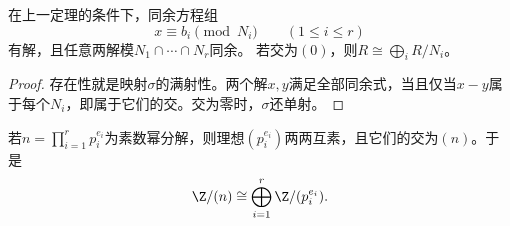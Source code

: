 \begin{corollary}\label{p2:ring-crt-congruence}
在上一定理的条件下，同余方程组
\[
x\equiv b_i\pmod{N_i}\qquad(1\leq i\leq r)
\]
有解，且任意两解模$N_1\cap\cdots\cap N_r$同余。
若交为$(0)$，则$R\cong\bigoplus_i R/N_i$。
\end{corollary}
\begin{proof}
存在性就是映射$\sigma$的满射性。两个解$x,y$满足全部同余式，当且仅当$x-y$属于每个$N_i$，即属于它们的交。交为零时，$\sigma$还单射。
\end{proof}

\begin{example}
若$n=\prod_{i=1}^r p_i^{e_i}$为素数幂分解，则理想$(p_i^{e_i})$两两互素，且它们的交为$(n)$。于是
\[
\Z/(n)\cong\bigoplus_{i=1}^r\Z/(p_i^{e_i}).
\]
\end{example}

